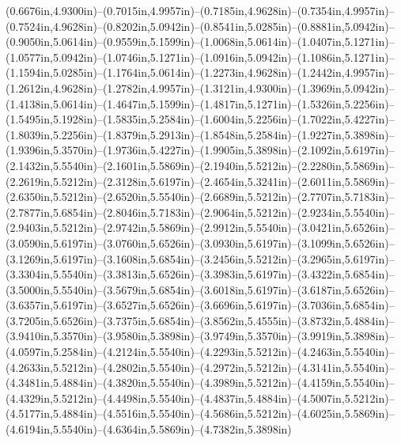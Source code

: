 (0.6676in,4.9300in)--(0.7015in,4.9957in)--(0.7185in,4.9628in)--(0.7354in,4.9957in)--(0.7524in,4.9628in)--(0.8202in,5.0942in)--(0.8541in,5.0285in)--(0.8881in,5.0942in)--(0.9050in,5.0614in)--(0.9559in,5.1599in)--(1.0068in,5.0614in)--(1.0407in,5.1271in)--(1.0577in,5.0942in)--(1.0746in,5.1271in)--(1.0916in,5.0942in)--(1.1086in,5.1271in)--(1.1594in,5.0285in)--(1.1764in,5.0614in)--(1.2273in,4.9628in)--(1.2442in,4.9957in)--(1.2612in,4.9628in)--(1.2782in,4.9957in)--(1.3121in,4.9300in)--(1.3969in,5.0942in)--(1.4138in,5.0614in)--(1.4647in,5.1599in)--(1.4817in,5.1271in)--(1.5326in,5.2256in)--(1.5495in,5.1928in)--(1.5835in,5.2584in)--(1.6004in,5.2256in)--(1.7022in,5.4227in)--(1.8039in,5.2256in)--(1.8379in,5.2913in)--(1.8548in,5.2584in)--(1.9227in,5.3898in)--(1.9396in,5.3570in)--(1.9736in,5.4227in)--(1.9905in,5.3898in)--(2.1092in,5.6197in)--(2.1432in,5.5540in)--(2.1601in,5.5869in)--(2.1940in,5.5212in)--(2.2280in,5.5869in)--(2.2619in,5.5212in)--(2.3128in,5.6197in)--(2.4654in,5.3241in)--(2.6011in,5.5869in)--(2.6350in,5.5212in)--(2.6520in,5.5540in)--(2.6689in,5.5212in)--(2.7707in,5.7183in)--(2.7877in,5.6854in)--(2.8046in,5.7183in)--(2.9064in,5.5212in)--(2.9234in,5.5540in)--(2.9403in,5.5212in)--(2.9742in,5.5869in)--(2.9912in,5.5540in)--(3.0421in,5.6526in)--(3.0590in,5.6197in)--(3.0760in,5.6526in)--(3.0930in,5.6197in)--(3.1099in,5.6526in)--(3.1269in,5.6197in)--(3.1608in,5.6854in)--(3.2456in,5.5212in)--(3.2965in,5.6197in)--(3.3304in,5.5540in)--(3.3813in,5.6526in)--(3.3983in,5.6197in)--(3.4322in,5.6854in)--(3.5000in,5.5540in)--(3.5679in,5.6854in)--(3.6018in,5.6197in)--(3.6187in,5.6526in)--(3.6357in,5.6197in)--(3.6527in,5.6526in)--(3.6696in,5.6197in)--(3.7036in,5.6854in)--(3.7205in,5.6526in)--(3.7375in,5.6854in)--(3.8562in,5.4555in)--(3.8732in,5.4884in)--(3.9410in,5.3570in)--(3.9580in,5.3898in)--(3.9749in,5.3570in)--(3.9919in,5.3898in)--(4.0597in,5.2584in)--(4.2124in,5.5540in)--(4.2293in,5.5212in)--(4.2463in,5.5540in)--(4.2633in,5.5212in)--(4.2802in,5.5540in)--(4.2972in,5.5212in)--(4.3141in,5.5540in)--(4.3481in,5.4884in)--(4.3820in,5.5540in)--(4.3989in,5.5212in)--(4.4159in,5.5540in)--(4.4329in,5.5212in)--(4.4498in,5.5540in)--(4.4837in,5.4884in)--(4.5007in,5.5212in)--(4.5177in,5.4884in)--(4.5516in,5.5540in)--(4.5686in,5.5212in)--(4.6025in,5.5869in)--(4.6194in,5.5540in)--(4.6364in,5.5869in)--(4.7382in,5.3898in) 
